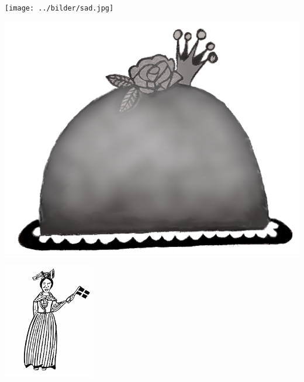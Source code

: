 %



\sclearpage

\sclearpage

\sclearpage

\sclearpage

\begin{intersong}
	\begin{center}
		\texttt{[image: ../bilder/sad.jpg]} 
	\end{center}
\end{intersong}
\sclearpage

\sclearpage

\sclearpage

\sclearpage

\sclearpage

\sclearpage

\sclearpage

\sclearpage

\sclearpage

\begin{intersong}
\begin{center}
\includegraphics[width=1\textwidth]{../bilder/fardigabilder/CamillasFardigaBilder/Sverigesnationalsangprincesstarta.png} 
\end{center}
\end{intersong}
\sclearpage

\begin{intersong}
	\begin{center}
		\includegraphics[width=4cm]{../bilder/fardigabilder/Danmarksnationalsng.png} 
	\end{center}
\end{intersong}


\sclearpage


\sclearpage
